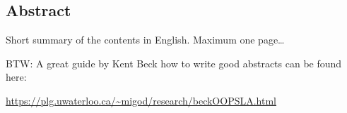 

\begin{otherlanguage}{american}
	\chapter*{Abstract}
	Short summary of the contents in English. Maximum one page\dots
	\medskip
	
	\noindent
	BTW: A great guide by Kent Beck how to write good abstracts can be found here:
	\begin{center}
		\url{https://plg.uwaterloo.ca/~migod/research/beckOOPSLA.html}
	\end{center}
\end{otherlanguage}